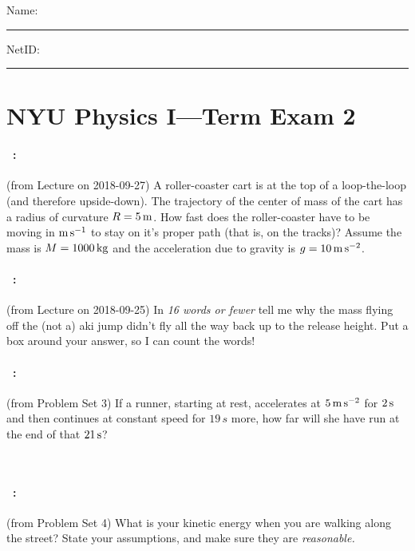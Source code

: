 \documentclass[12pt]{article}
\begin{document}
\noindent
Name: \rule[-1ex]{0.55\textwidth}{0.1pt}
NetID: \rule[-1ex]{0.2\textwidth}{0.1pt}

\section*{NYU Physics I---Term Exam 2}

\paragraph{\problemname~\theproblem:}%
(from Lecture on 2018-09-27)
A roller-coaster cart is at the top of a loop-the-loop (and therefore
upside-down). The trajectory of the center of mass of the cart has a
radius of curvature $R=5\,\mathrm{m}$. How fast does the roller-coaster have
to be moving in $\mathrm{m}\,\mathrm{s}^{-1}$ to stay on it's proper path (that is, on the
tracks)?  Assume the mass is $M=1000\,\mathrm{kg}$ and the acceleration due to
gravity is $g=10\,\mathrm{m}\,\mathrm{s}^{-2}$.

\vfill

\paragraph{\problemname~\theproblem:}%
(from Lecture on 2018-09-25)
In \emph{16 words or fewer} tell me why the mass flying off the
(not a) aki jump didn't fly
all the way back up to the release height. Put a box around your answer,
so I can count the words!

\vfill

\paragraph{\problemname~\theproblem:}%
(from Problem Set 3)
If a runner, starting at rest, accelerates at $5\,\mathrm{m}\,\mathrm{s}^{-2}$ for $2\,\mathrm{s}$
and then continues at constant speed for $19\,s$ more, how far will
she have run at the end of that $21\,\mathrm{s}$?

\vfill
~

\clearpage
\paragraph{\problemname~\theproblem:}%
(from Problem Set 4)
What is your kinetic energy when you are walking along the street?
State your assumptions, and make sure they are \emph{reasonable.}

\vfill
\end{document}

